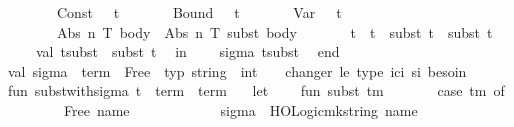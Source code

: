 \begin{isabellebody}
\ \ \ \ \ \ {\isacharbar}{\kern0pt}\ Const\ {\isacharunderscore}{\kern0pt}\ {\isacharequal}{\kern0pt}{\isachargreater}{\kern0pt}\ t\isanewline
\ \ \ \ \ \ {\isacharbar}{\kern0pt}\ Bound\ {\isacharunderscore}{\kern0pt}\ {\isacharequal}{\kern0pt}{\isachargreater}{\kern0pt}\ t\isanewline
\ \ \ \ \ \ {\isacharbar}{\kern0pt}\ Var\ {\isacharunderscore}{\kern0pt}\ {\isacharequal}{\kern0pt}{\isachargreater}{\kern0pt}\ t\isanewline
\ \ \ \ \ \ {\isacharbar}{\kern0pt}\ Abs\ {\isacharparenleft}{\kern0pt}n{\isacharcomma}{\kern0pt}\ T{\isacharcomma}{\kern0pt}\ body{\isacharparenright}{\kern0pt}\ {\isacharequal}{\kern0pt}{\isachargreater}{\kern0pt}\ Abs\ {\isacharparenleft}{\kern0pt}n{\isacharcomma}{\kern0pt}\ T{\isacharcomma}{\kern0pt}\ subst\ body{\isacharparenright}{\kern0pt}\isanewline
\ \ \ \ \ \ {\isacharbar}{\kern0pt}\ t{}\ {\isachardollar}{\kern0pt}\ t{}\ {\isacharequal}{\kern0pt}{\isachargreater}{\kern0pt}\ subst\ t{}\ {\isachardollar}{\kern0pt}\ subst\ t{}\isanewline
\isanewline
\ \ \ \ val\ t{\isacharunderscore}{\kern0pt}subst\ {\isacharequal}{\kern0pt}\ subst\ t\isanewline
\ \ in\isanewline
\ \ \ \ {\isacharparenleft}{\kern0pt}sigma{\isacharcomma}{\kern0pt}\ t{\isacharunderscore}{\kern0pt}subst{\isacharparenright}{\kern0pt}\isanewline
\ \ end\isanewline
{\isacharasterisk}{\kern0pt}{\isacharparenright}{\kern0pt}\isanewline
\isanewline
val\ sigma\ {\isacharcolon}{\kern0pt}\ term\ {\isacharequal}{\kern0pt}\ Free\ {\isacharparenleft}{\kern0pt}{\isachardoublequote}{\kern0pt}{\isasymsigma}{\isachardoublequote}{\kern0pt}{\isacharcomma}{\kern0pt}\ {\isacharat}{\kern0pt}{\isacharbraceleft}{\kern0pt}typ\ {\isachardoublequote}{\kern0pt}string\ {\isasymRightarrow}\ int{\isachardoublequote}{\kern0pt}{\isacharbraceright}{\kern0pt}{\isacharparenright}{\kern0pt}\ \ \ {\isacharparenleft}{\kern0pt}{\isacharasterisk}{\kern0pt}\ changer\ le\ type\ ici\ si\ besoin\ {\isacharasterisk}{\kern0pt}{\isacharparenright}{\kern0pt}\isanewline
\isanewline
\isanewline
fun\ subst{\isacharunderscore}{\kern0pt}with{\isacharunderscore}{\kern0pt}sigma\ {\isacharparenleft}{\kern0pt}t\ {\isacharcolon}{\kern0pt}\ term{\isacharparenright}{\kern0pt}\ {\isacharcolon}{\kern0pt}\ term\ {\isacharequal}{\kern0pt}\isanewline
\ \ let\isanewline
\ \ \ \ fun\ subst\ tm\ {\isacharequal}{\kern0pt}\isanewline
\ \ \ \ \ \ case\ tm\ of\isanewline
\ \ \ \ \ \ \ \ Free\ {\isacharparenleft}{\kern0pt}name{\isacharcomma}{\kern0pt}\ {\isacharunderscore}{\kern0pt}{\isacharparenright}{\kern0pt}\ \ \ \ \ \ \ \ \ \ \ {\isacharequal}{\kern0pt}{\isachargreater}{\kern0pt}\ sigma\ {\isachardollar}{\kern0pt}\ HOLogic{\isachardot}{\kern0pt}mk{\isacharunderscore}{\kern0pt}string\ name\isanewline

\end{isabellebody}
